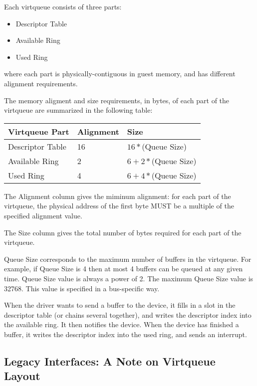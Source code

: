 Each virtqueue consists of three parts:

\begin{itemize}
\item Descriptor Table
\item Available Ring
\item Used Ring
\end{itemize}

where each part is physically-contiguous in guest memory,
and has different alignment requirements.

The memory aligment and size requirements, in bytes, of each part of the
virtqueue are summarized in the following table:

\begin{tabular}{|l|l|l|}
\hline
Virtqueue Part    & Alignment & Size \\
\hline \hline
Descriptor Table  & 16        & $16 * $(Queue Size) \\
\hline
Available Ring    & 2         & $6 + 2 * $(Queue Size) \\
 \hline
Used Ring         & 4         & $6 + 4 * $(Queue Size) \\
 \hline
\end{tabular}

The Alignment column gives the miminum alignment: for each part
of the virtqueue, the physical address of the first byte
MUST be a multiple of the specified alignment value.

The Size column gives the total number of bytes required for each
part of the virtqueue.

Queue Size corresponds to the maximum number of buffers in the
virtqueue.  For example, if Queue Size is 4 then at most 4 buffers
can be queued at any given time.  Queue Size value is always a
power of 2.  The maximum Queue Size value is 32768.  This value
is specified in a bus-specific way.

When the driver wants to send a buffer to the device, it fills in
a slot in the descriptor table (or chains several together), and
writes the descriptor index into the available ring.  It then
notifies the device. When the device has finished a buffer, it
writes the descriptor index into the used ring, and sends an interrupt.


\subsection{Legacy Interfaces: A Note on Virtqueue Layout}\label{sec:Basic Facilities of a Virtio Device / Virtqueues / Legacy Interfaces: A Note on Virtqueue Layout}

